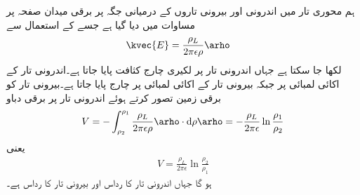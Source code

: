 ہم محوری تار میں اندرونی اور بیرونی تاروں کے درمیانی جگہ پر برقی میدان صفحہ  پر  مساوات  میں دیا گیا ہے جسے  کے استعمال سے
\begin{align}\label{مساوات_توانائی_ہم_محوری_تار_ذوبرق_میدان}
\kvec{E}&=\frac{\rho_L}{2\pi \epsilon \rho} \arho
\end{align}
لکھا جا سکتا ہے جہاں اندرونی تار پر  لکیری چارج کثافت پایا جاتا ہے۔اندرونی تار  کے اکائی لمبائی پر  جبکہ بیرونی تار کے اکائی لمبائی پر  چارج پایا جاتا ہے۔بیرونی تار کو برقی زمین تصور کرتے ہوئے اندرونی تار پر برقی دباو
\begin{align*}
V=-\int_{\rho_2}^{\rho_1} \frac{\rho_L}{2\pi \epsilon \rho} \arho \cdot  \dif \rho \arho=-\frac{\rho_L}{2\pi\epsilon} \ln \frac{\rho_1}{\rho_2}
\end{align*}
یعنی
\begin{align}\label{مساوات_توانائی_ہم_محوری_تار_برقی_دباو}
V=\frac{\rho_L}{2\pi\epsilon} \ln \frac{\rho_2}{\rho_1}
\end{align}
ہو گا جہاں اندرونی تار کا رداس  اور بیرونی تار کا رداس  ہے۔

